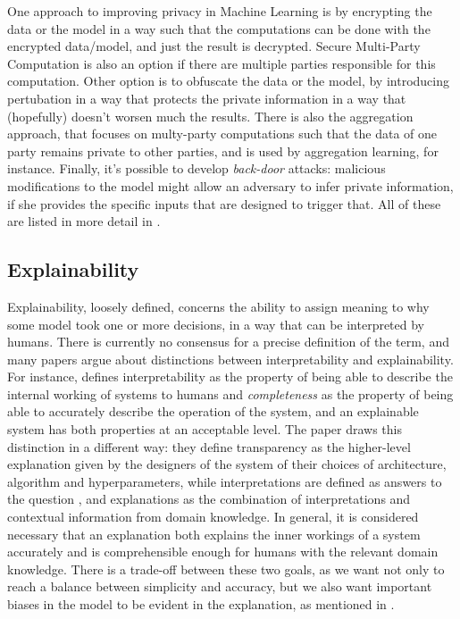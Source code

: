 One approach to improving privacy in Machine Learning is by encrypting the data or the model in a way such that the computations can be done with the encrypted data/model, and just the result is decrypted. Secure Multi-Party Computation is also an option if there are multiple parties responsible for this computation. Other option is to obfuscate the data or the model, by introducing pertubation in a way that protects the private information in a way that (hopefully) doesn't worsen much the results. There is also the aggregation approach, that focuses on multy-party computations such that the data of one party remains private to other parties, and is used by aggregation learning, for instance. Finally, it's possible to develop \textit{back-door} attacks: malicious modifications to the model might allow an adversary to infer private information, if she provides the specific inputs that are designed to trigger that. All of these are listed in more detail in \cite{WMLMPASAO}.


\subsection{Explainability}

Explainability, loosely defined, concerns the ability to assign meaning to why some model took one or more decisions, in a way that can be interpreted by humans. There is currently no consensus for a precise definition of the term, and many papers argue about distinctions between interpretability and explainability. For instance, \cite{Explaining Explanations: An Overview of Interpretability of Machine Learning} defines interpretability as the property of being able to describe the internal working of systems to humans and \textit{completeness} as the property of being able to accurately describe the operation of the system, and an explainable system has both properties at an acceptable level. The paper \cite{Explainable Machine Learning for Scientific Insights and Discoveries} draws this distinction in a different way: they define transparency as the higher-level explanation given by the designers of the system of their choices of architecture, algorithm and hyperparameters, while interpretations are defined as answers to the question , and explanations as the combination of interpretations and contextual information from domain knowledge. In general, it is considered necessary that an explanation both explains the inner workings of a system accurately and is comprehensible enough for humans with the relevant domain knowledge. There is a trade-off between these two goals, as we want not only to reach a balance between simplicity and accuracy, but we also want important biases in the model to be evident in the explanation, as mentioned in \cite{Explaining Explanations: An Overview of Interpretability of Machine Learning}.

